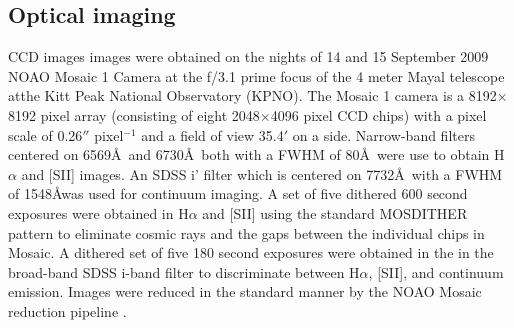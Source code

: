 % 
% 
% 

\subsection{Optical imaging}

CCD images images were obtained on the nights of 14 and 15 September 2009
NOAO Mosaic 1 Camera at the f/3.1 prime focus 
of the 4 meter Mayal telescope atthe  Kitt Peak National Observatory (KPNO).  
The Mosaic 1 camera is a 8192$\times$8192 pixel array (consisting of eight 
2048$\times$4096 pixel CCD chips) with a pixel scale of 0.26$''$ pixel$^{-1}$ and 
a field of view 35.4$'$ on a side.  Narrow-band filters centered on 
6569\AA\ and 6730\AA\ both with a FWHM of 80\AA\ were use to obtain 
H$\alpha$ and [SII] images.  An SDSS i' filter which is centered on 
7732\AA\ with a FWHM of 1548\AA was used for continuum imaging.
A set of five dithered 600 second exposures were obtained in 
H$\alpha$ and [SII] using the standard MOSDITHER pattern 
to eliminate cosmic rays and the gaps between the
individual chips in Mosaic.  A dithered set of five 180 second 
exposures were obtained in the in the broad-band SDSS i-band filter to
discriminate between H$\alpha$, [SII], and continuum emission. 
Images were reduced in the standard manner by the NOAO Mosaic reduction
pipeline \citep{valdes2007}.   



